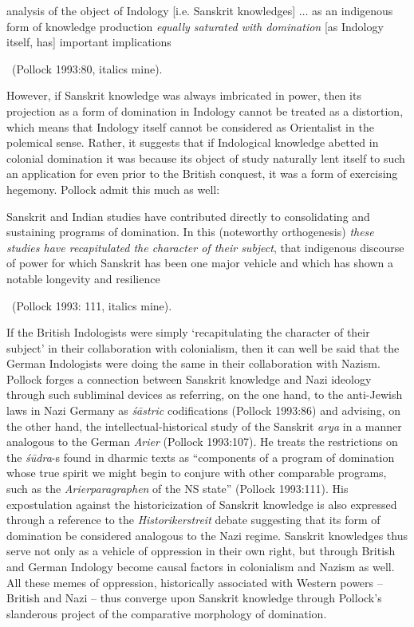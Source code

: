 \begin{myquote}
[An] analysis of the object of Indology [i.e. Sanskrit knowledges] $\ldots$ as an indigenous form of knowledge production {\sl equally saturated with domination} [as Indology itself, has] important implications 

~\hfill(Pollock 1993:80, italics mine). 
\end{myquote}
However, if Sanskrit knowledge was always imbricated in power, then its projection as a form of domination in Indology cannot be treated as a distortion, which means that Indology itself cannot be considered as Orientalist in the polemical sense. Rather, it suggests that if Indological knowledge abetted in colonial domination it was because its object of study naturally lent itself to such an application for even prior to the British conquest, it was a form of exercising hegemony. Pollock admit this much as well:
\newpage

\begin{myquote}
Sanskrit and Indian studies have contributed directly to   consolidating and sustaining programs of domination. In this (noteworthy orthogenesis) {\sl these studies have recapitulated the character of their subject}, that indigenous discourse of power for which Sanskrit has been one major vehicle and which has shown a notable longevity and resilience

~\hfill  (Pollock 1993: 111, italics mine).
\end{myquote}
If the British Indologists were simply ‘recapitulating the character of their subject’ in their collaboration with colonialism, then it can well be said that the German Indologists were doing the same in their collaboration with Nazism. Pollock forges a connection between Sanskrit knowledge and Nazi ideology through such subliminal devices as referring, on the one hand, to the anti-Jewish laws in Nazi Germany as {\sl śāstric} codifications (Pollock 1993:86) and advising, on the other hand, the intellectual-historical study of the Sanskrit {\sl arya} in a manner analogous to the German {\sl Arier} (Pollock 1993:107). He treats the restrictions on the {\sl śūdra}-s found in dharmic texts as “components of a program of domination whose true spirit we might begin to conjure with other comparable programs, such as the {\sl Arierparagraphen} of the NS state” (Pollock 1993:111). His expostulation against the historicization of Sanskrit knowledge is also expressed through a reference to the {\sl Historikerstreit} debate suggesting that its form of domination be considered analogous to the Nazi regime. Sanskrit knowledges thus serve not only as a vehicle of oppression in their own right, but through British and German Indology become causal factors in colonialism and Nazism as well. All these memes of oppression, historically associated with Western powers – British and Nazi – thus converge upon Sanskrit knowledge through Pollock’s slanderous project of the comparative morphology of domination.


